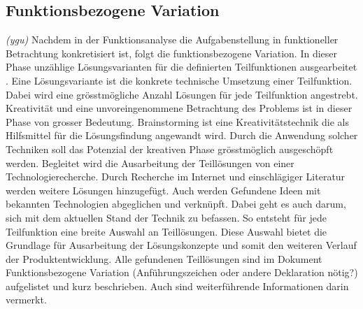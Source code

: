 \subsection{Funktionsbezogene Variation}
\label{funktionsbez_var}
\textit{(ygu)} Nachdem in der Funktionsanalyse die Aufgabenstellung in funktioneller Betrachtung konkretisiert ist, folgt die funktionsbezogene Variation. In dieser Phase unzählige Lösungsvarianten für die definierten Teilfunktionen ausgearbeitet \cite{pahl}. Eine Lösungsvariante ist die konkrete technische Umsetzung einer Teilfunktion. Dabei wird eine grösstmögliche Anzahl Lösungen für jede Teilfunktion angestrebt. 
\newline
Kreativität und eine unvoreingenommene Betrachtung des Problems ist in dieser Phase von grosser Bedeutung. Brainstorming ist eine Kreativitätstechnik die als Hilfsmittel für die Lösungsfindung angewandt wird. Durch die Anwendung solcher Techniken soll das Potenzial der kreativen Phase grösstmöglich ausgeschöpft werden.
\newline
Begleitet wird die Ausarbeitung der Teillösungen von einer Technologierecherche. Durch Recherche im Internet und einschlägiger Literatur werden weitere Lösungen hinzugefügt. Auch werden Gefundene Ideen mit bekannten Technologien abgeglichen und verknüpft. Dabei geht es auch darum, sich mit dem aktuellen Stand der Technik zu befassen. 
\newline
So entsteht für jede Teilfunktion eine breite Auswahl an Teillösungen. Diese Auswahl bietet die Grundlage für Ausarbeitung der Lösungskonzepte und somit den weiteren Verlauf der Produktentwicklung. Alle gefundenen Teillösungen sind im Dokument Funktionsbezogene Variation (Anführungszeichen oder andere Deklaration nötig?) aufgelistet und kurz beschrieben. Auch sind weiterführende Informationen darin vermerkt.
